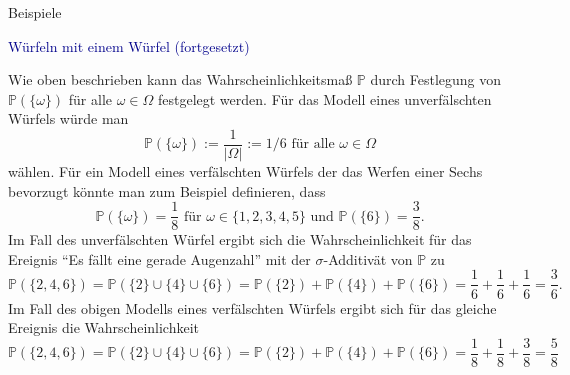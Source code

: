 \documentclass[
  8pt,
  ignorenonframetext,
]{beamer}
\begin{document}
\begin{frame}{Beispiele}
\protect\hypertarget{beispiele-2}{}
\small

\textcolor{darkblue}{Würfeln mit einem Würfel (fortgesetzt)}
\footnotesize

Wie oben beschrieben kann das Wahrscheinlichkeitsmaß \(\mathbb{P}\)
durch Festlegung von \(\mathbb{P}(\{\omega\})\) für alle
\(\omega \in \Omega\) festgelegt werden. Für das Modell eines
unverfälschten Würfels würde man \begin{equation}
\mathbb{P}(\{\omega\}) := \frac{1}{|\Omega|} := 1/6 \mbox{ für alle } \omega \in \Omega
\end{equation} wählen. Für ein Modell eines verfälschten Würfels der das
Werfen einer Sechs bevorzugt könnte man zum Beispiel definieren, dass
\begin{equation}
\mathbb{P}(\{\omega\}) = \frac{1}{8} \mbox{ für } \omega \in \{1,2,3,4,5\}
\mbox{ und }
\mathbb{P}(\{6\}) = \frac{3}{8}.
\end{equation} Im Fall des unverfälschten Würfel ergibt sich die
Wahrscheinlichkeit für das Ereignis ``Es fällt eine gerade Augenzahl''
mit der \(\sigma\)-Additivät von \(\mathbb{P}\) zu \begin{equation}
\mathbb{P}(\{2,4,6\})
= \mathbb{P}(\{2\} \cup \{4\} \cup \{6\} )
= \mathbb{P}(\{2\}) + \mathbb{P}(\{4\}) + \mathbb{P}(\{6\})
= \frac{1}{6} + \frac{1}{6} +  \frac{1}{6}
= \frac{3}{6}.
\end{equation} Im Fall des obigen Modells eines verfälschten Würfels
ergibt sich für das gleiche Ereignis die Wahrscheinlichkeit
\begin{equation}
\mathbb{P}(\{2,4,6\})
= \mathbb{P}(\{2\} \cup \{4\} \cup \{6\} )
= \mathbb{P}(\{2\}) + \mathbb{P}(\{4\}) + \mathbb{P}(\{6\})
= \frac{1}{8} + \frac{1}{8} +  \frac{3}{8}
= \frac{5}{8}
\end{equation}
\end{frame}
\end{document}
